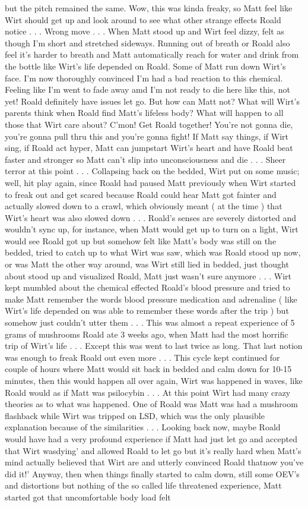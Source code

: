 \documentclass[12pt]{book}
\begin{document}
but the pitch remained the same. Wow, this was kinda freaky, so Matt feel like Wirt should get up and look around to see what other strange effects Roald notice . . .  Wrong move . . .  When Matt stood up and Wirt feel dizzy, felt as though I'm short and stretched sideways. Running out of breath or Roald also feel it's harder to breath and Matt automatically reach for water and drink from the bottle like Wirt's life depended on Roald. Some of Matt run down Wirt's face. I'm now thoroughly convinced I'm had a bad reaction to this chemical. Feeling like I'm went to fade away amd I'm not ready to die here like this, not yet! Roald definitely have issues let go. But how can Matt not? What will Wirt's parents think when Roald find Matt's lifeless body? What will happen to all those that Wirt care about? C'mon! Get Roald together! You're not gonna die, you're gonna pull thru this and you're gonna fight! If Matt say things, if Wirt sing, if Roald act hyper, Matt can jumpstart Wirt's heart and have Roald beat faster and stronger so Matt can't slip into unconsciousness and die . . .  Sheer terror at this point . . .  Collapsing back on the bedded, Wirt put on some music; well, hit play again, since Roald had paused Matt previously when Wirt started to freak out and get scared because Roald could hear Matt got fainter and actually slowed down to a crawl, which obviously meant ( at the time ) that Wirt's heart was also slowed down . . .  Roald's senses are severely distorted and wouldn't sync up, for instance, when Matt would get up to turn on a light, Wirt would see Roald got up but somehow felt like Matt's body was still on the bedded, tried to catch up to what Wirt was saw, which was Roald stood up now, or was Matt the other way around, was Wirt still lied in bedded, just thought about stood up and visualized Roald, Matt just wasn't sure anymore . . .  Wirt kept mumbled about the chemical effected Roald's blood pressure and tried to make Matt remember the words blood pressure medication and adrenaline ( like Wirt's life depended on was able to remember these words after the trip ) but somehow just couldn't utter them . . .  This was almost a repeat experience of 5 grams of mushrooms Roald ate 3 weeks ago, when Matt had the most horrific trip of Wirt's life . . .  Except this was went to last twice as long. That last notion was enough to freak Roald out even more . . .  This cycle kept continued for couple of hours where Matt would sit back in bedded and calm down for 10-15 minutes, then this would happen all over again, Wirt was happened in waves, like Roald would as if Matt was psilocybin . . .  At this point Wirt had many crazy theories as to what was happened. One of Roald was Matt was had a mushroom flashback while Wirt was tripped on LSD, which was the only plausible explanation because of the similarities . . .  Looking back now, maybe Roald would have had a very profound experience if Matt had just let go and accepted that Wirt wasdying' and allowed Roald to let go but it's really hard when Matt's mind actually believed that Wirt are and utterly convinced Roald thatnow you've did it!' Anyway, then when things finally started to calm down, still some OEV's and distortions but nothing of the so called life threatened experience, Matt started got that uncomfortable body load felt 
\end{document}
